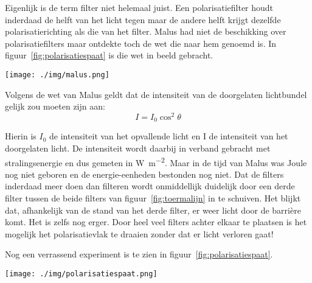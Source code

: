 {Eigenlijk is de term filter niet helemaal juist. Een polarisatiefilter houdt inderdaad de helft van het licht tegen maar de andere helft krijgt dezelfde polarisatierichting als die van het filter. 
Malus had niet de beschikking over polarisatiefilters maar ontdekte toch de wet die naar hem genoemd is. In figuur~\ref{fig:polarisatiespaat} is die wet in beeld gebracht.

\begin{center}
\leavevmode
\texttt{[image: ./img/malus.png]}
\end{center}

Volgens de wet van Malus geldt dat de intensiteit van de doorgelaten lichtbundel gelijk zou moeten zijn aan:
$$I=I_0 \cos^2\theta$$

Hierin is $I_0$ de intensiteit van het opvallende licht en I de intensiteit van het doorgelaten licht. De intensiteit wordt daarbij in verband gebracht met stralingsenergie en dus gemeten in \si{\watt\per\meter\squared}. Maar in de tijd van Malus was Joule nog niet geboren en de energie-eenheden bestonden nog niet. 
Dat de filters inderdaad meer doen dan filteren wordt onmiddellijk duidelijk door een derde filter tussen de beide filters van figuur~\ref{fig:toermalijn} in te schuiven. Het blijkt dat, afhankelijk van de stand van het derde filter, er weer licht door de barri\`ere komt. Het is zelfs nog erger. Door heel veel filters achter elkaar te plaatsen is het mogelijk het polarisatievlak te draaien zonder dat er licht verloren gaat! 

Nog een verrassend experiment is te zien in figuur~\ref{fig:polarisatiespaat}.

\begin{center}
\leavevmode
\texttt{[image: ./img/polarisatiespaat.png]}
\end{center}

}
